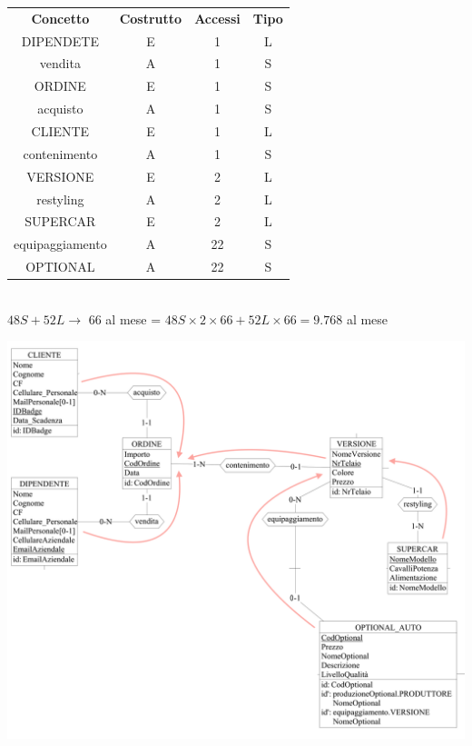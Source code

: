 \documentclass[11pt]{article}
\begin{document}
\begin{table}[H]
    \centering
    \begin{tabular}{ c c c c } 
        \rowcolor{red!20!}
        \textbf{Concetto} & \textbf{Costrutto} & \textbf{Accessi} &
        \textbf{Tipo}\\ 
        DIPENDETE & E & 1 & L \\
        vendita & A & 1 & S \\
        ORDINE & E & 1 & S \\ 
        acquisto & A & 1 & S \\
        CLIENTE & E & 1 & L \\  
        contenimento & A & 1 & S \\
        VERSIONE & E & 2 & L \\
        restyling & A & 2 & L \\
        SUPERCAR & E & 2 & L \\ 
        equipaggiamento & A & 22 & S \\
        OPTIONAL & A & 22 & S \\
    \end{tabular}\\
    \( 48S + 52L \rightarrow \) 66 al mese = \( 48S \times 2 \times 66 + 52L \times
    66 = 9.768\) al mese
\end{table}

\begin{center}
    \includegraphics[width=\linewidth]{images/navigationSchemes/creaOrdine.png}
\end{center}
\end{document}

